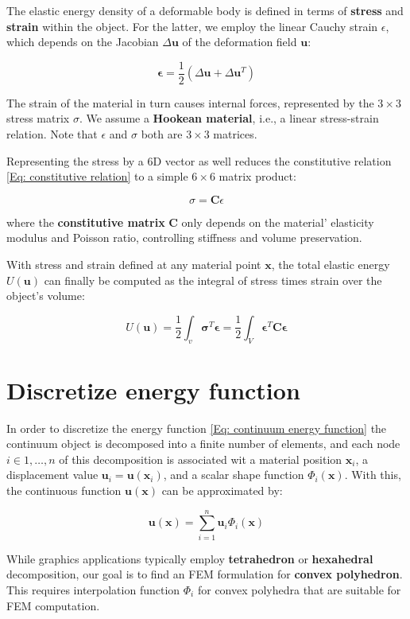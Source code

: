 The elastic energy density of a deformable body is defined in terms of \textbf{stress} and \textbf{strain} within the object. For the latter, we employ the linear Cauchy strain $ \epsilon $, which depends on the Jacobian $ \Delta \mathbf{u} $ of the deformation field $ \mathbf{u} $:

\begin{equation}
\mathbf{\epsilon} = \dfrac{1}{2} (\Delta \mathbf{u} + \Delta \mathbf{u}^\mathit{T})
\label{Eq: constitutive relation}
\end{equation}

The strain of the material in turn causes internal forces, represented by the $ 3\times 3 $ stress matrix $ \sigma $. We assume a \textbf{Hookean material}, i.e., a linear stress-strain relation. Note that $ \epsilon $ and $ \sigma $ both are $ 3\times 3 $ matrices.

Representing the stress by a 6D vector as well reduces the constitutive relation \ref{Eq: constitutive relation} to a simple $ 6\times 6 $ matrix product:

\begin{equation}
\sigma = \mathbf{C}\epsilon
\end{equation}

where the \textbf{constitutive matrix} $ \mathbf{C} $ only depends on the material' elasticity modulus and Poisson ratio, controlling stiffness and volume preservation.

With stress and strain defined at any material point $ \mathbf{x} $, the total elastic energy $ \mathit{U}(\mathbf{u}) $ can finally be computed as the integral of stress times strain over the object's volume:

\begin{equation}
U(\mathbf{u}) = \dfrac{1}{2}\int_v{\mathbf{\sigma}^T \mathbf{\epsilon}} = \dfrac{1}{2}\int_V{\mathbf{\epsilon}^T \mathbf{C} \mathbf{\epsilon}}
\label{Eq: continuum energy function}
\end{equation}

\section{Discretize energy function}
In order to discretize the energy function \ref{Eq: continuum energy function} the continuum object is decomposed into a finite number of elements, and each node $ i\in {1, \ldots, n} $ of this decomposition is associated wit a material position $ \mathbf{x}_i $, a displacement value $ \mathbf{u}_i= \mathbf{u}(\mathbf{x}_i) $, and a scalar shape function $ \Phi_i(\mathbf{x}) $. With this, the continuous function $ \mathbf{u} (\mathbf{x}) $ can be approximated by:

\begin{equation}
\mathbf{u}(\mathbf{x}) = \sum_{i=1}^{n}{\mathbf{u}_i\Phi_i(\mathbf{x})}
\end{equation}

While graphics applications typically employ \textbf{tetrahedron} or \textbf{hexahedral} decomposition, our goal is to find an FEM formulation for \textbf{convex polyhedron}. This requires interpolation function $ \Phi_i $ for convex polyhedra that are suitable for FEM computation.